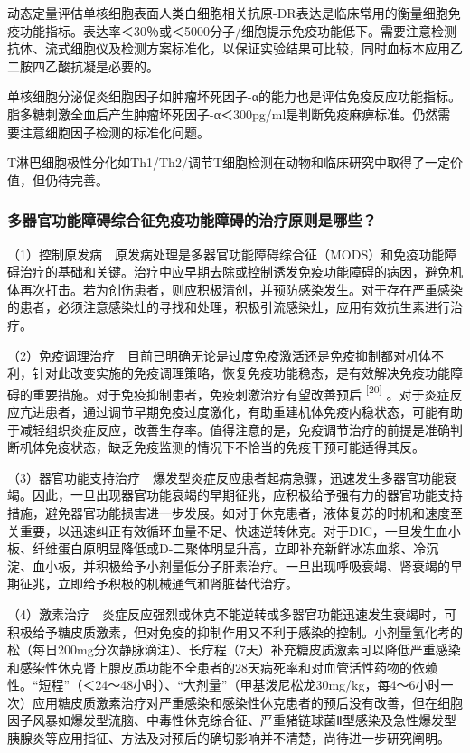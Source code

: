 动态定量评估单核细胞表面人类白细胞相关抗原-DR表达是临床常用的衡量细胞免疫功能指标。表达率＜30％或＜5000分子/细胞提示免疫功能低下。需要注意检测抗体、流式细胞仪及检测方案标准化，以保证实验结果可比较，同时血标本应用乙二胺四乙酸抗凝是必要的。

单核细胞分泌促炎细胞因子如肿瘤坏死因子-α的能力也是评估免疫反应功能指标。脂多糖刺激全血后产生肿瘤坏死因子-α＜300pg/ml是判断免疫麻痹标准。仍然需要注意细胞因子检测的标准化问题。

T淋巴细胞极性分化如Th1/Th2/调节T细胞检测在动物和临床研究中取得了一定价值，但仍待完善。

\subsubsection{多器官功能障碍综合征免疫功能障碍的治疗原则是哪些？}

（1）控制原发病　原发病处理是多器官功能障碍综合征（MODS）和免疫功能障碍治疗的基础和关键。治疗中应早期去除或控制诱发免疫功能障碍的病因，避免机体再次打击。若为创伤患者，则应积极清创，并预防感染发生。对于存在严重感染的患者，必须注意感染灶的寻找和处理，积极引流感染灶，应用有效抗生素进行治疗。

（2）免疫调理治疗　目前已明确无论是过度免疫激活还是免疫抑制都对机体不利，针对此改变实施的免疫调理策略，恢复免疫功能稳态，是有效解决免疫功能障碍的重要措施。对于免疫抑制患者，免疫刺激治疗有望改善预后
\protect\hyperlink{text00007.htmlux5cux23ch20-6}{\textsuperscript{{[}20{]}}}
。对于炎症反应亢进患者，通过调节早期免疫过度激化，有助重建机体免疫内稳状态，可能有助于减轻组织炎症反应，改善生存率。值得注意的是，免疫调节治疗的前提是准确判断机体免疫状态，缺乏免疫监测的情况下不恰当的免疫干预可能适得其反。

（3）器官功能支持治疗　爆发型炎症反应患者起病急骤，迅速发生多器官功能衰竭。因此，一旦出现器官功能衰竭的早期征兆，应积极给予强有力的器官功能支持措施，避免器官功能损害进一步发展。如对于休克患者，液体复苏的时机和速度至关重要，以迅速纠正有效循环血量不足、快速逆转休克。对于DIC，一旦发生血小板、纤维蛋白原明显降低或D-二聚体明显升高，立即补充新鲜冰冻血浆、冷沉淀、血小板，并积极给予小剂量低分子肝素治疗。一旦出现呼吸衰竭、肾衰竭的早期征兆，立即给予积极的机械通气和肾脏替代治疗。

（4）激素治疗　炎症反应强烈或休克不能逆转或多器官功能迅速发生衰竭时，可积极给予糖皮质激素，但对免疫的抑制作用又不利于感染的控制。小剂量氢化考的松（每日200mg分次静脉滴注）、长疗程（7天）补充糖皮质激素可以降低严重感染和感染性休克肾上腺皮质功能不全患者的28天病死率和对血管活性药物的依赖性。“短程”（＜24～48小时）、“大剂量”（甲基泼尼松龙30mg/kg，每4～6小时一次）应用糖皮质激素治疗对严重感染和感染性休克患者的预后没有改善，但在细胞因子风暴如爆发型流脑、中毒性休克综合征、严重猪链球菌Ⅱ型感染及急性爆发型胰腺炎等应用指征、方法及对预后的确切影响并不清楚，尚待进一步研究阐明。

